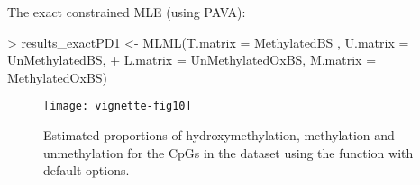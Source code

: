 \documentclass{article}
\begin{document}
The exact constrained MLE (using PAVA):

\begin{Schunk}
\begin{Sinput}
> results_exactPD1 <- MLML(T.matrix = MethylatedBS , U.matrix = UnMethylatedBS,
+                       L.matrix = UnMethylatedOxBS, M.matrix = MethylatedOxBS)
\end{Sinput}
\end{Schunk}





\begin{figure*}[h]
 \texttt{[image: vignette-fig10]}
 \caption{\label{fig:fig10} Estimated proportions of hydroxymethylation, methylation and unmethylation for the CpGs in the dataset using the  function with default options.}
\end{figure*}




\end{document}
